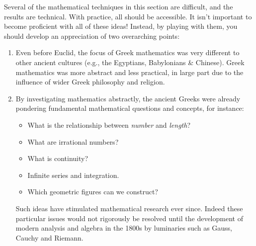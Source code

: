 Several of the mathematical techniques in this section are difficult, and the results are technical. With practice, all should be accessible. It isn't important to become proficient with all of these ideas! Instead, by playing with them, you should develop an appreciation of two overarching points:
\begin{enumerate}
  \item Even before Euclid, the focus of Greek mathematics was very different to other ancient cultures (e.g., the Egyptians, Babylonians \& Chinese). Greek mathematics was more abstract and less practical, in large part due to the influence of wider Greek philosophy and religion.
  \item By investigating mathematics abstractly, the ancient Greeks were already pondering fundamental mathematical questions and concepts, for instance:
  \begin{itemize}
    \item What is the relationship between \emph{number} and \emph{length}?
    \item What are irrational numbers?
    \item What is continuity?
    \item Infinite series and integration.
    \item Which geometric figures can we construct?
  \end{itemize}
  Such ideas have stimulated mathematical research ever since. Indeed these particular issues would not rigorously be resolved until the development of modern analysis and algebra in the 1800s by luminaries such as Gauss, Cauchy and Riemann.
\end{enumerate}


\clearpage


